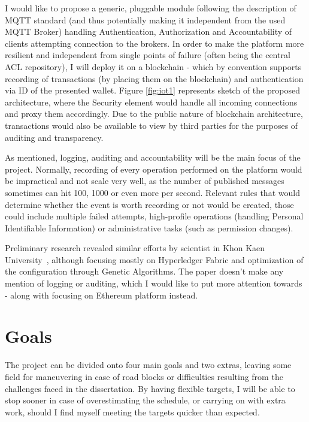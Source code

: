 \documentclass[a4paper,12pt]{article}
\begin{document}
I would like to propose a generic, pluggable module following the description of MQTT standard (and thus potentially making it independent from the used MQTT Broker) handling Authentication, Authorization and Accountability of clients attempting connection to the brokers. In order to make the platform more resilient and independent from single points of failure (often being the central ACL repository), I will deploy it on a blockchain - which by convention supports recording of transactions (by placing them on the blockchain) and authentication via ID of the presented wallet. Figure \ref{fig:iot1} represents sketch of the proposed architecture, where the Security element would handle all incoming connections and proxy them accordingly. Due to the public nature of blockchain architecture, transactions would also be available to view by third parties for the purposes of auditing and transparency.

As mentioned, logging, auditing and accountability will be the main focus of the project. Normally, recording of every operation performed on the platform would be impractical and not scale very well, as the number of published messages sometimes can hit 100, 1000 or even more per second. Relevant rules that would determine whether the event is worth recording or not would be created, those could include multiple failed attempts, high-profile operations (handling Personal Identifiable Information) or administrative tasks (such as permission changes).

Preliminary research revealed similar efforts by scientist in Khon Kaen University~\cite{8523942}, although focusing mostly on Hyperledger Fabric and optimization of the configuration through Genetic Algorithms. The paper doesn't make any mention of logging or auditing, which I would like to put more attention towards - along with focusing on Ethereum platform instead.


\section*{Goals}

The project can be divided onto four main goals and two extras, leaving some field for maneuvering in case of road blocks or difficulties resulting from the challenges faced in the dissertation. By having flexible targets, I will be able to stop sooner in case of overestimating the schedule, or carrying on with extra work, should I find myself meeting the targets quicker than expected. 
\end{document}
